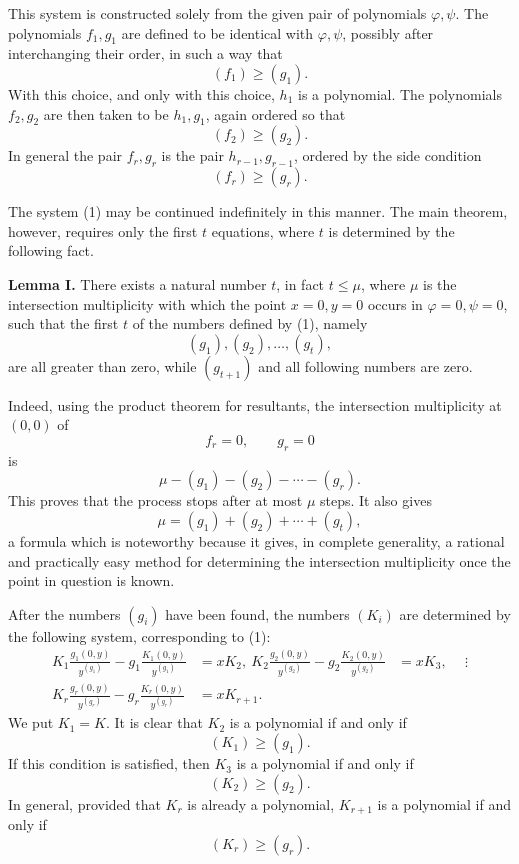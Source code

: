 \documentclass[12pt]{article}
\begin{document}
This system is constructed solely from the given pair of polynomials \(\varphi,\psi\). The polynomials \(f_1,g_1\) are defined to be identical with \(\varphi,\psi\), possibly after interchanging their order, in such a way that
\[
  (f_1)\ge (g_1).
\]
With this choice, and only with this choice, \(h_1\) is a polynomial. The polynomials \(f_2,g_2\) are then taken to be \(h_1,g_1\), again ordered so that
\[
  (f_2)\ge (g_2).
\]
In general the pair \(f_r,g_r\) is the pair \(h_{r-1},g_{r-1}\), ordered by the side condition
\[
  (f_r)\ge (g_r).
\]

The system (1) may be continued indefinitely in this manner. The main theorem, however, requires only the first \(t\) equations, where \(t\) is determined by the following fact.

\textbf{Lemma I.} There exists a natural number \(t\), in fact \(t\le \mu\), where \(\mu\) is the intersection multiplicity with which the point \(x=0,y=0\) occurs in \(\varphi=0,\psi=0\), such that the first \(t\) of the numbers defined by (1), namely
\[
  (g_1),(g_2),\ldots,(g_t),
\]
are all greater than zero, while \((g_{t+1})\) and all following numbers are zero.

Indeed, using the product theorem for resultants, the intersection multiplicity at \((0,0)\) of
\[
  f_r=0,
  \qquad
  g_r=0
\]
is
\[
  \mu-(g_1)-(g_2)-\cdots-(g_r).
\]
This proves that the process stops after at most \(\mu\) steps. It also gives
\[
  \mu=(g_1)+(g_2)+\cdots+(g_t),
\tag{2}
\]
a formula which is noteworthy because it gives, in complete generality, a rational and practically easy method for determining the intersection multiplicity once the point in question is known.

After the numbers \((g_i)\) have been found, the numbers \((K_i)\) are determined by the following system, corresponding to (1):
\[
\begin{aligned}
  K_1\frac{g_1(0,y)}{y^{(g_1)}}
     -g_1\frac{K_1(0,y)}{y^{(g_1)}} &= xK_2,\
  K_2\frac{g_2(0,y)}{y^{(g_2)}}
     -g_2\frac{K_2(0,y)}{y^{(g_2)}} &= xK_3,\
  &\ \vdots \\
  K_r\frac{g_r(0,y)}{y^{(g_r)}}
     -g_r\frac{K_r(0,y)}{y^{(g_r)}} &= xK_{r+1}.
\end{aligned}
\tag{3}
\]
We put \(K_1=K\). It is clear that \(K_2\) is a polynomial if and only if
\[
  (K_1)\ge (g_1).
\]
If this condition is satisfied, then \(K_3\) is a polynomial if and only if
\[
  (K_2)\ge (g_2).
\]
In general, provided that \(K_r\) is already a polynomial, \(K_{r+1}\) is a polynomial if and only if
\[
  (K_r)\ge (g_r).
\]
\end{document}
